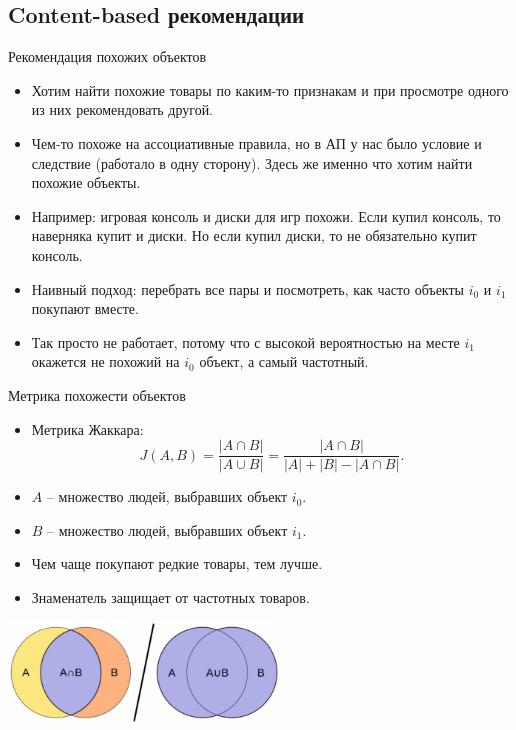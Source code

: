 \documentclass[9pt]{beamer}
\begin{document}
\subsection{Content-based рекомендации}

\begin{frame}{Рекомендация похожих объектов}
\begin{itemize}
    \item Хотим найти похожие товары по каким-то признакам и при просмотре одного из них рекомендовать другой.
    \item Чем-то похоже на ассоциативные правила, но в АП у нас было условие и следствие (работало в одну сторону). Здесь же именно что хотим найти похожие объекты.
    \item Например: игровая консоль и диски для игр похожи. Если купил консоль, то наверняка купит и диски. Но если купил диски, то не обязательно купит консоль.
    \item Наивный подход: перебрать все пары и посмотреть, как часто объекты $i_0$ и $i_1$ покупают вместе.
    \item Так просто не работает, потому что с высокой вероятностью на месте $i_1$ окажется не похожий на $i_0$ объект, а самый частотный.
\end{itemize}
\end{frame}

\begin{frame}{Метрика похожести объектов}
    \begin{itemize}
        \item Метрика Жаккара:
        $$J(A, B)=\frac{|A\cap B|}{|A\cup B|}=\frac{|A\cap B|}{|A| + |B| - |A\cap B|}.$$
        \item $A$ – множество людей, выбравших объект $i_0$.
        \item $B$ – множество людей, выбравших объект $i_1$.
        \item Чем чаще покупают редкие товары, тем лучше.
        \item Знаменатель защищает от частотных товаров.
    \end{itemize}
    
    \begin{center}\includegraphics[height=100px]{img/jaccard.png}\end{center}
\end{frame}
\end{document}
